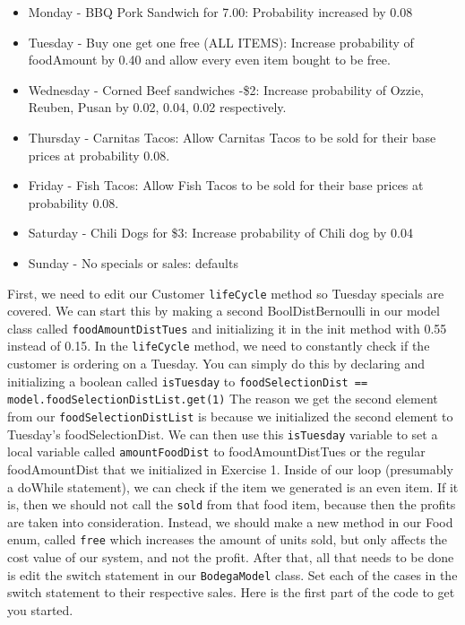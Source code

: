 \documentclass[11pt]{article}
\newcommand{\code}[1]{\texttt{#1}}
\newcommand{\class}[1]{\texttt{#1}}
\newcommand{\method}[1]{\texttt{#1}}
\begin{document}
\begin{itemize}[noitemsep]
	\item Monday - BBQ Pork Sandwich for 7.00:  Probability increased by 0.08
	\item Tuesday - Buy one get one free (ALL ITEMS): Increase probability of foodAmount by 0.40 and allow every even item bought to be free.
	\item Wednesday - Corned Beef sandwiches -\$2:  Increase probability of Ozzie, Reuben, Pusan by 0.02, 0.04, 0.02 respectively.
	\item Thursday - Carnitas Tacos: Allow Carnitas Tacos to be sold for their base prices at probability 0.08.
	\item Friday - Fish Tacos: Allow Fish Tacos to be sold for their base prices at probability 0.08.
	\item Saturday - Chili Dogs for \$3: Increase probability of Chili dog by 0.04
	\item Sunday - No specials or sales: defaults
\end{itemize}
First, we need to edit our Customer \method{lifeCycle} method so Tuesday specials are covered. We can start this by making a second BoolDistBernoulli in our
model class called \code{foodAmountDistTues} and initializing it in the init method with 0.55 instead of 0.15. In the \method{lifeCycle} method, we need to constantly
check if the customer is ordering on a Tuesday. You can simply do this by declaring and initializing a boolean called \code{isTuesday} to \code{foodSelectionDist == model.foodSelectionDistList.get(1)}
The reason we get the second element from our \code{foodSelectionDistList} is because we initialized the second element to Tuesday's foodSelectionDist. We can then use this \code{isTuesday} variable
to set a local variable called \code{amountFoodDist} to foodAmountDistTues or the regular foodAmountDist that we initialized in Exercise 1.
Inside of our loop (presumably a doWhile statement), we can check if the item we generated is an even item.
If it is, then we should not call the \method{sold} from that food item, because then the profits are taken into consideration. Instead, we should make a new method
in our Food enum, called \method{free} which increases the amount of units sold, but only affects the cost value of our system, and not the profit.
\newline
After that, all that needs to be done is edit the switch statement in our \class{BodegaModel} class. Set each of the cases in the switch statement to their respective sales.
Here is the first part of the code to get you started.
\end{document}
